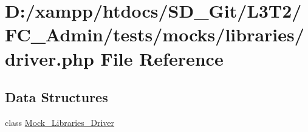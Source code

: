 \hypertarget{tests_2mocks_2libraries_2_driver_8php}{}\section{D\+:/xampp/htdocs/\+S\+D\+\_\+\+Git/\+L3\+T2/\+F\+C\+\_\+\+Admin/tests/mocks/libraries/driver.php File Reference}
\label{tests_2mocks_2libraries_2_driver_8php}
\subsection*{Data Structures}
\begin{DoxyCompactItemize}
\item 
class \hyperlink{class_mock___libraries___driver}{Mock\+\_\+\+Libraries\+\_\+\+Driver}
\end{DoxyCompactItemize}
